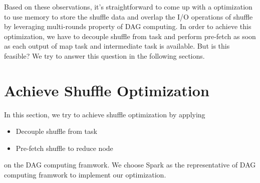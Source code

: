 \documentclass[10pt,twocolumn]{article}
\begin{document}
Based on these observations, it's straightforward to come up with a optimization to use memory to store the shuffle data and overlap the I/O operations of shuffle
by leveraging multi-rounds property of DAG computing. In order to achieve this optimization, we have to decouple shuffle from task and 
perform pre-fetch as soon as each output of map task and intermediate task is available. But is this feasible? We try to answer this question
in the following sections.

\section{Achieve Shuffle Optimization}
In this section, we try to achieve shuffle optimization by applying
\begin{itemize}
	\item Decouple shuffle from task
	\item Pre-fetch shuffle to reduce node
\end{itemize}
on the DAG computing framwork.
We choose Spark as the representative of DAG computing framwork to implement our optimization.
\end{document}
